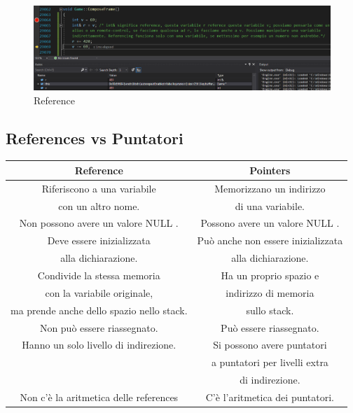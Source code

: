 \begin{figure}[ht]
	\centering
	\includegraphics[width=1\textwidth, height=1\textheight, keepaspectratio]{./imgs/References2.png}
	\caption{Reference}
	\label{fig:references2}
\end{figure}

\subsection{References vs Puntatori}

\begin{tabular}{|c|c|}
	\hline
	\textbf{Reference} & \textbf{Pointers} \\
	\hline
	\textsf{\small Riferiscono a una variabile } & \textsf{\small Memorizzano un indirizzo } \\
	\textsf{\small con un altro nome.} & \textsf{\small di una variabile.} \\
	\hline
	\textsf{\small Non possono avere un valore \color{myblue2}NULL \normalcolor.} & \textsf{\small Possono avere un valore \color{myblue2}NULL \normalcolor.} \\
	\hline
	\textsf{\small Deve essere inizializzata } & \textsf{\small Può anche non essere inizializzata } \\
	\textsf{\small alla dichiarazione.} & \textsf{\small alla dichiarazione.} \\
	\hline
	\textsf{\small Condivide la stessa memoria  } & \textsf{\small Ha un proprio spazio e } \\
	\textsf{\small con la variabile originale, } & \textsf{\small indirizzo di memoria } \\
	\textsf{\small ma prende anche dello spazio nello stack.} & \textsf{\small sullo stack.} \\
	\hline
	\textsf{\small Non può essere riassegnato.} & \textsf{\small Può essere riassegnato.} \\
	\hline
	\textsf{\small Hanno un solo livello di indirezione.} & \textsf{\small Si possono avere puntatori } \\
	\textsf{\small } & \textsf{\small a puntatori per livelli extra } \\
	\textsf{\small } & \textsf{\small di indirezione.} \\
	\hline
	\textsf{\small Non c'è la aritmetica delle references} & \textsf{\small C'è l'aritmetica dei puntatori.} \\
	\hline
\end{tabular}

